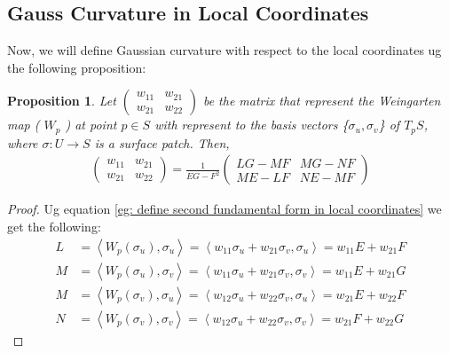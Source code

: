 \documentclass{article}
\theoremstyle{plain}
\newtheorem{proposition}{Proposition}
\theoremstyle{definition}
\theoremstyle{remark}
\begin{document}
\subsection{Gauss Curvature in Local Coordinates}
Now, we will define Gaussian curvature with respect to the local coordinates ug the following proposition:
\begin{proposition}
    Let \( \begin{pmatrix}
        w_{11} & w_{21} \\
        w_{21} & w_{22} 
    \end{pmatrix}\)
    be the matrix that represent the Weingarten map ( \(W_p\) ) at point \( p \in S\) with represent to the basis vectors \{\( \sigma_u, \sigma_v \)\} of \( T_pS \), where \( \sigma: U \rightarrow S\) is a surface patch. Then, 
    \begin{align} \label{eq: Weingarten map local coordinates}
        \begin{pmatrix}
            w_{11} & w_{21} \\
            w_{21} & w_{22} 
        \end{pmatrix} = \frac{1}{EG-F^2} \begin{pmatrix}
            LG - MF & MG - NF \\
            ME - LF & NE- MF
        \end{pmatrix}
    \end{align}
\end{proposition}
\begin{proof}
    Ug equation \ref{eg: define second fundamental form in local coordinates} we get the following:
    \begin{align*}
        L & = \left\langle W_p(\sigma_u), \sigma_u \right\rangle = \left\langle w_{11}\sigma_u + w_{21}\sigma_v, \sigma_u\right\rangle = w_{11}E + w_{21}F \\
        M & = \left\langle W_p(\sigma_u), \sigma_v \right\rangle =  \left\langle w_{11}\sigma_u + w_{21}\sigma_v, \sigma_v\right\rangle = w_{11}E + w_{21}G  \\
        M & = \left\langle W_p(\sigma_v), \sigma_u \right\rangle = \left\langle w_{12}\sigma_u + w_{22}\sigma_v, \sigma_u\right\rangle = w_{21}E + w_{22}F  \\
        N & = \left\langle W_p(\sigma_v), \sigma_v \right\rangle = \left\langle w_{12}\sigma_u + w_{22}\sigma_v, \sigma_v\right\rangle = w_{21}F + w_{22}G  
    \end{align*}
\end{proof}
\end{document}
